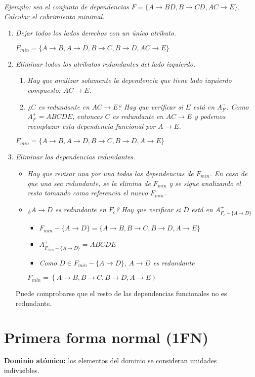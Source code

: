\documentclass[a4paper, twoside]{article}
\begin{document}
\emph{Ejemplo: sea el conjunto de dependencias $F=\{A\to BD,B\to CD,AC\to E\}$. Calcular el cubrimiento minimal.}
\begin{enumerate}
	\item \emph{Dejar todos los lados derechos con un único atributo.}
	
	\emph{$F_{min}=\{A\to B,A\to D,B\to C,B\to D,AC\to E\}$}

	\item \emph{Eliminar todos los atributos redundantes del lado izquierdo.}
	\begin{enumerate}
		\item \emph{Hay que analizar solamente la dependencia que tiene lado izquierdo compuesto: $AC\to E$.}
		\item \emph{¿$C$ es redundante en $AC\to E$? Hay que verificar si $E$ está en $A_{F}^{+}$. Como $A_{F}^{+}=ABCDE$, entonces $C$ es redundante en $AC\to E$ y podemos reemplazar esta dependencia funcional por
$A\to E$.}
	\end{enumerate}

	\emph{$F_{min}=\{A\to B,A\to D,B\to C,B\to D,A\to E\}$}

	\item \emph{Eliminar las dependencias redundantes.}
	\begin{itemize}
		\item \emph{Hay que revisar una por una todas las dependencias de $F_{min}$. En caso de que una sea redundante, se la elimina de $F_{min}$ y se sigue analizando el resto tomando como referencia el nuevo $F_{min}$. }
		\item \emph{¿$A\to D$ es redundante en $F_{c}$? Hay que verificar si $D$ está en $A_{F_{c}-\{A\to D\}}^{+}$}
		\begin{itemize}
			\item \emph{$F_{min}-\{A\to D\}=\{A\to B,B\to C,B\to D,A\to E\}$}
			\item \emph{$A_{F_{min}-\{A\to D\}}^{+}=ABCDE$}
			\item \emph{Como $D\in F_{min}-\{A\to D\}$, $A\to D$ es redundante}
		\end{itemize}

		$F_{min}=\left\{ A\to B,B\to C,B\to D,A\to E\right\} $
	\end{itemize}

	Puede comprobarse que el resto de las dependencias funcionales no es redundante.
\end{enumerate}

\section{Primera forma normal (1FN)}
\textbf{Dominio atómico:} los elementos del dominio se consideran unidades indivisibles.
\end{document}
